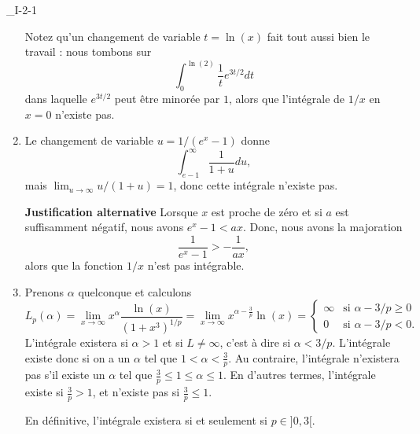 \begin{corrige}{_I-2-1}
\begin{enumerate}
Notez qu'un changement de variable $t=\ln(x)$ fait tout aussi bien le travail : nous tombons sur
\begin{equation}
	\int_{0}^{\ln(2)}\frac{1}{ t } e^{3t/2}dt
\end{equation}
dans laquelle $ e^{3t/2}$ peut être minorée par $1$, alors que l'intégrale de $1/x$ en $x=0$ n'existe pas.

\item 

Le changement de variable $u=1/(e^x-1)$ donne
\begin{equation}
	\int_{e-1}^{\infty}\frac{1}{ 1+u }du,
\end{equation}
mais $\lim_{u\to\infty}u/(1+u)=1$, donc cette intégrale n'existe pas.

{\bf Justification alternative}
Lorsque $x$ est proche de zéro et si $a$ est suffisamment négatif, nous avons $ e^{x}-1<ax$. Donc, nous avons la majoration
\begin{equation}
	\frac{1}{  e^{x}-1 }>-\frac{1}{ ax },
\end{equation}
alors que la fonction $1/x$ n'est pas intégrable.

\item 

Prenons $\alpha$ quelconque et calculons
\begin{equation}
	L_p(\alpha)=\lim_{x\to\infty}x^{\alpha}\frac{ \ln(x) }{ (1+x^3)^{1/p} }=\lim_{x\to\infty}x^{\alpha-\frac{ 3 }{ p }}\ln(x)=\begin{cases}
	\infty	&	\text{si $\alpha-3/p\geq 0$}\\
	0	&	 \text{si $\alpha-3/p<0$.}
\end{cases}
\end{equation}
L'intégrale existera si $\alpha>1$ et si $L\neq\infty$, c'est à dire si $\alpha<3/p$.  L'intégrale existe donc si on a un $\alpha$ tel que $1<\alpha<\frac{ 3 }{ p }$. Au contraire, l'intégrale n'existera pas s'il existe un $\alpha$ tel que $\frac{ 3 }{ p }\leq 1\leq\alpha\leq 1$. En d'autres termes, l'intégrale existe si $\frac{ 3 }{ p }>1$, et n'existe pas si $\frac{ 3 }{ p }\leq 1$.

En définitive, l'intégrale existera si et seulement si $p\in]0,3[$.


\end{enumerate}
\end{corrige}
